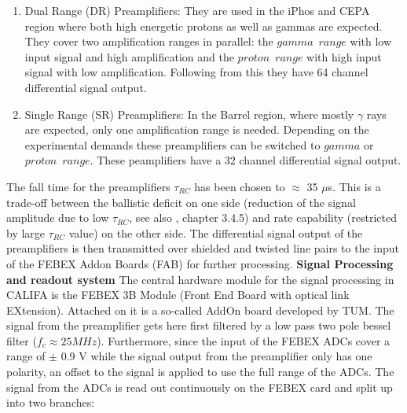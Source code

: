 \begin{enumerate}
\item Dual Range (DR) Preamplifiers: They are used in the iPhos and CEPA region where both high energetic protons as well as gammas are expected. They cover two amplification ranges in parallel: the $gamma \enspace range$ with low input signal and high amplification and the $proton \enspace range$ with high input signal with low amplification. Following from this they have 64 channel differential signal output.
\item Single Range (SR) Preamplifiers: In the Barrel region, where mostly $\gamma$ rays are expected, only one amplification range is needed. Depending on the experimental demands these preamplifiers can be switched to $gamma$ or $proton \enspace range$. These peamplifiers have a 32 channel differential signal output.
\end{enumerate}
The fall time for the preamplifiers $\tau_{RC}$ has been chosen to $\approx$ 35 $\mu$s. This is a trade-off between the ballistic deficit on one side (reduction of the signal amplitude due to low $\tau_{RC}$, see also \cite{winkel2011implementierung}, chapter 3.4.5) and rate capability (restricted by large $\tau_{RC}$ value) on the other side.\newline
The differential signal output of the preamplifiers is then transmitted over shielded and twisted line pairs to the input of the FEBEX Addon Boards (FAB) for further processing.\newline
\textbf{Signal Processing and readout system}\newline
The central hardware module for the signal processing in CALIFA is the FEBEX 3B Module (Front End Board with optical link EXtension\cite{febex-tec}). Attached on it is a so-called AddOn board developed by TUM. The signal from the preamplifier gets here first filtered by a low pass two pole bessel filter ($f_{c} \approx 25 MHz$). Furthermore, since the input of the FEBEX ADCs cover a range of $\pm$ 0.9 V while the signal output from the preamplifier only has one polarity, an offset to the signal is applied to use the full range of the ADCs. The signal from the ADCs is read out continuously on the FEBEX card and split up into two branches:\newline
